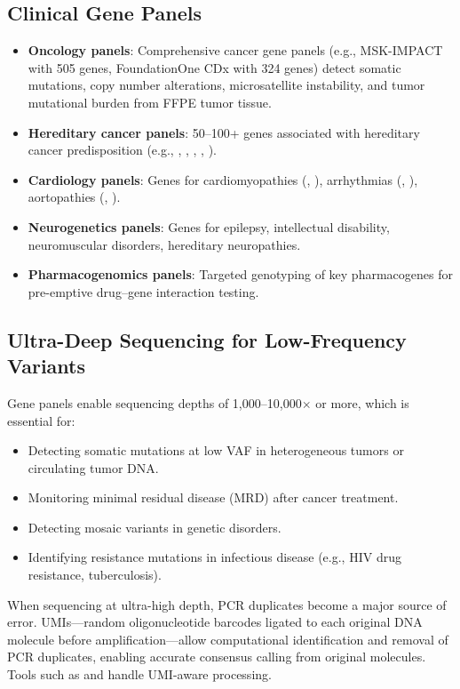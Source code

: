 \subsection{Clinical Gene Panels}

\begin{itemize}[nosep]
  \item \textbf{Oncology panels}: Comprehensive cancer gene panels (e.g., MSK-IMPACT with 505 genes, FoundationOne CDx with 324 genes) detect somatic mutations, copy number alterations, microsatellite instability, and tumor mutational burden from FFPE tumor tissue.
  \item \textbf{Hereditary cancer panels}: 50--100+ genes associated with hereditary cancer predisposition (e.g., , , , , ).
  \item \textbf{Cardiology panels}: Genes for cardiomyopathies (, ), arrhythmias (, ), aortopathies (, ).
  \item \textbf{Neurogenetics panels}: Genes for epilepsy, intellectual disability, neuromuscular disorders, hereditary neuropathies.
  \item \textbf{Pharmacogenomics panels}: Targeted genotyping of key pharmacogenes for pre-emptive drug--gene interaction testing.
\end{itemize}

\subsection{Ultra-Deep Sequencing for Low-Frequency Variants}

Gene panels enable sequencing depths of 1,000--10,000$\times$ or more, which is essential for:

\begin{itemize}[nosep]
  \item Detecting somatic mutations at low VAF in heterogeneous tumors or circulating tumor DNA.
  \item Monitoring minimal residual disease (MRD) after cancer treatment.
  \item Detecting mosaic variants in genetic disorders.
  \item Identifying resistance mutations in infectious disease (e.g., HIV drug resistance, tuberculosis).
\end{itemize}

\begin{tipbox}[title={Unique Molecular Identifiers (UMIs)}]
When sequencing at ultra-high depth, PCR duplicates become a major source of error. UMIs---random oligonucleotide barcodes ligated to each original DNA molecule before amplification---allow computational identification and removal of PCR duplicates, enabling accurate consensus calling from original molecules. Tools such as  and  handle UMI-aware processing.
\end{tipbox}

